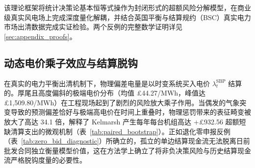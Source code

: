 该理论框架将统计决策论基本恒等式操作为封闭形式的超额风险分解模型，在商业级真实风电场上完成深度量化解耦，并结合英国平衡与结算规约（BSC）真实电力市场出清数据完成实证检验。两个反例的完整数学证明详见\ref{sec:appendix_proofs}。

\subsection{动态电价乘子效应与结算脱钩}
在真实的电力平衡出清机制下，物理偏差电量是以时变系统买入电价 $\lambda_t^{\text{SBP}}$ 结算的。厚尾且高度偏斜的极端电价分布（均值 \pounds 44.27/MWh，峰值达 \pounds 1,509.80/MWh）在工程现场起到了剧烈的风险放大乘子作用。当偶发的气象突变导致的预测偏差恰好与极端高电价在时间上重叠时，物理惩罚带来的表征畸变被放大了高达 34.1 倍，解释了 Kelmarsh 产生每年每台机组高达 +\pounds 932.56 超额短缺清算支出的微观机制（表~\ref{tab:paired_bootstrap}）。正如退化零申报反例（表~\ref{tab:zero_bid_diagnostic}）所确立的，孤立的单边结算现金流无法脱离日前批发合同独立衡量模型价值，这在方法学上确立了将非负决策风险与历史结算现金流严格脱钩度量的必要性。
